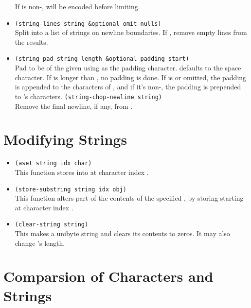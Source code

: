 \begin{itemize}[itemsep=10pt]
  If  is non-,  will be encoded before limiting.
\item \lstinline|(string-lines string &optional omit-nulls)|\\
  Split  into a list of strings on newline boundaries.
  If , remove empty lines from the results.
\item \lstinline|(string-pad string length &optional padding start)|\\
  Pad  to be of the given  using  as the padding character.
   defaults to the space character.
  If  is longer than , no padding is done.
  If  is  or omitted, the padding is appended to the characters of , and if it’s non-, the padding is prepended to ’s characters.
  \lstinline|(string-chop-newline string)|\\
  Remove the final newline, if any, from .
\end{itemize}


\section{Modifying Strings}
\label{sec:modifying-strings}

\begin{itemize}[itemsep=10pt]
\item\lstinline|(aset string idx char)|\\
  This function stores  into  at character index .
\item \lstinline|(store-substring string idx obj)|\\
  This function alters part of the contents of the specified , by storing  starting at character index .
\item \lstinline|(clear-string string)|\\
  This makes  a unibyte string and clears its contents to zeros.
  It may also change 's length.
\end{itemize}

\section{Comparsion of Characters and Strings}
\label{sec:comp-char-strings}

